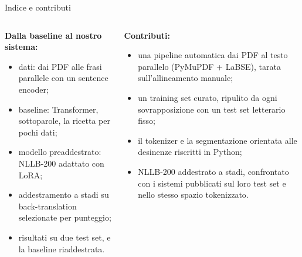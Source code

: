 \documentclass[aspectratio=169]{beamer}
\newcommand{\T}[2]{#2}
\newcommand{\T}[2]{#1}
\begin{document}
\begin{frame}{\T{Roadmap and contributions}{Indice e contributi}}
  \begin{columns}[t]
    \begin{column}{0.46\textwidth}
      \textbf{\T{From the baseline to ours:}{Dalla baseline al nostro sistema:}}
      \begin{itemize}
        \item \T{data: PDFs to parallel sentences with a sentence encoder;}%
              {dati: dai PDF alle frasi parallele con un sentence encoder;}
        \item \T{baseline: Transformer, subwords, the low-resource recipe;}%
              {baseline: Transformer, sottoparole, la ricetta per pochi dati;}
        \item \T{pretrained: NLLB-200 adapted with LoRA;}%
              {modello preaddestrato: NLLB-200 adattato con LoRA;}
        \item \T{staged training on scored back-translations;}%
              {addestramento a stadi su back-translation selezionate per punteggio;}
        \item \T{results on two test sets, and the baseline retrained.}%
              {risultati su due test set, e la baseline riaddestrata.}
      \end{itemize}
    \end{column}
    \begin{column}{0.54\textwidth}
      \textbf{\T{Contributions:}{Contributi:}}
      \begin{itemize}
        \item \T{an automatic PDF-to-parallel-text pipeline (PyMuPDF + LaBSE), tuned against the
              hand alignment;}%
              {una pipeline automatica dai PDF al testo parallelo (PyMuPDF + LaBSE), tarata
              sull'allineamento manuale;}
        \item \T{a curated training set guarded against a frozen literary test set;}%
              {un training set curato, ripulito da ogni sovrapposizione con un test set letterario fisso;}
        \item \T{the tokenizer and the desinence-biased segmentation ported to Python;}%
              {il tokenizer e la segmentazione orientata alle desinenze riscritti in Python;}
        \item \T{NLLB-200 trained in stages, compared with the published systems on their test
              set and in their tokenized space.}%
              {NLLB-200 addestrato a stadi, confrontato con i sistemi pubblicati sul loro test set e nello stesso spazio tokenizzato.}
      \end{itemize}
    \end{column}
  \end{columns}
\end{frame}
\end{document}
